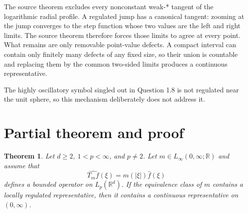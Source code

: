 \documentclass[11pt]{article}
\newtheorem{theorem}{Theorem}
\newcommand{\R}{\mathbb{R}}
\begin{document}
The source theorem excludes every nonconstant weak-* tangent of the
logarithmic radial profile. A regulated jump has a canonical tangent: zooming
at the jump converges to the step function whose two values are the left and
right limits. The source theorem therefore forces those limits to agree at
every point. What remains are only removable point-value defects. A compact
interval can contain only finitely many defects of any fixed size, so their
union is countable and replacing them by the common two-sided limits produces
a continuous representative.

The highly oscillatory symbol singled out in Question 1.8 is not regulated
near the unit sphere, so this mechanism deliberately does not address it.

\section{Partial theorem and proof}

\begin{theorem}\label{thm:main}
Let $d\ge 2$, $1<p<\infty$, and $p\ne2$. Let $m\in L_\infty(0,\infty;\R)$
and assume that
\[
  \widehat{T_m f}(\xi)=m(|\xi|)\widehat f(\xi)
\]
defines a bounded operator on $L_p(\R^d)$. If the equivalence class of $m$
contains a locally regulated representative, then it contains a continuous
representative on $(0,\infty)$.
\end{theorem}
\end{document}
